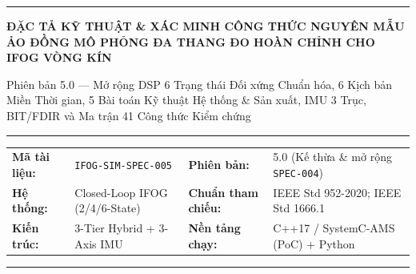\documentclass[11pt, a4paper]{article}
\begin{document}
\thispagestyle{plain}
{\color{primaryblue}\rule{\textwidth}{1.5pt}}
\vspace{0.3cm}

{\Large\bfseries\color{primaryblue} ĐẶC TẢ KỸ THUẬT \& XÁC MINH CÔNG THỨC NGUYÊN MẪU ẢO ĐỒNG MÔ PHỎNG ĐA THANG ĐO HOÀN CHỈNH CHO IFOG VÒNG KÍN}

\vspace{0.15cm}
{\normalsize\color{mutedgray} Phiên bản 5.0 --- Mở rộng DSP 6 Trạng thái Đối xứng Chuẩn hóa, 6 Kịch bản Miền Thời gian, 5 Bài toán Kỹ thuật Hệ thống \& Sản xuất, IMU 3 Trục, BIT/FDIR và Ma trận 41 Công thức Kiểm chứng}

\vspace{0.2cm}
{\color{rulegray}\rule{\textwidth}{0.6pt}}
\vspace{0.15cm}

\begin{tabular}{@{}l L{4.7cm} l L{5.1cm}@{}}
\textbf{Mã tài liệu:} & \texttt{IFOG-SIM-SPEC-005} & \textbf{Phiên bản:} & 5.0 (Kế thừa \& mở rộng \texttt{SPEC-004}) \\
\textbf{Hệ thống:} & Closed-Loop IFOG (2/4/6-State) & \textbf{Chuẩn tham chiếu:} & IEEE Std 952-2020; IEEE Std 1666.1 \\
\textbf{Kiến trúc:} & 3-Tier Hybrid + 3-Axis IMU & \textbf{Nền tảng chạy:} & C++17 / SystemC-AMS (PoC) + Python \\
\end{tabular}

\vspace{0.15cm}
{\color{primaryblue}\rule{\textwidth}{1.0pt}}
\vspace{0.25cm}
\end{document}
